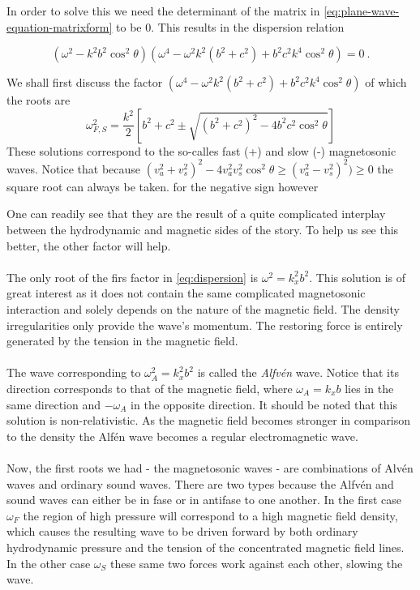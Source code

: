 In order to solve this we need the determinant of the matrix in \autoref{eq:plane-wave-equation-matrixform} to be $0$. This results in the dispersion relation

\begin{equation}
\label{eq:dispersion}
(\omega^2 - k^2 b^2\cos^2\theta)\left( \omega^4 - \omega^2k^2(b^2+c^2) + b^2 c^2k^4\cos^2\theta  \right) = 0 \ .
\end{equation}


We shall first discuss the factor $\left( \omega^4 - \omega^2k^2(b^2+c^2) + b^2 c^2k^4\cos^2\theta  \right)$
of which the roots are
\begin{equation}
	\omega_{F,S}^2 = \frac{k^2}{2} \left[ b^2+c^2 \pm \sqrt{(b^2+c^2)^2-4b^2c^2\cos^2\theta} \right] 	
	\label{eq:magnetosonic-phase-speed}
\end{equation}
These solutions correspond to the so-calles fast (+) and slow (-) magnetosonic waves. 
Notice that because $(v_a^2+v_s^2)^2-4v_a^2v_s^2\cos^2\theta \geq (v_a^2-v_s^2)^2) \geq 0$ the square root can always be taken.
for the negative sign however

One can readily see that they are the result of a quite complicated interplay between the hydrodynamic and magnetic sides of the story. 
To help us see this better, the other factor will help.\\
\\
The only root of the firs factor in \autoref{eq:dispersion} is $ \omega^2 = k_x^2 b^2 $. This solution is of great interest as it does not contain the same complicated magnetosonic interaction and solely depends on the nature of the magnetic field. The density irregularities only provide the wave's momentum. The restoring force is entirely generated by the tension in the magnetic field.\\
\\
The wave corresponding to $\omega_A^2 = k_x^2 b^2$ is called the \textit{Alfvén} wave. Notice that its direction corresponds to that of the magnetic field, where $\omega_A = k_x b$ lies in the same direction and $-\omega_A$ in the opposite direction. It should be noted that this solution is non-relativistic. As the magnetic field becomes stronger in comparison to the density the Alfén wave becomes a regular electromagnetic wave.\\
\\
Now, the first roots we had - the magnetosonic waves - are combinations of Alvén waves and ordinary sound waves. There are two types because the Alfvén and sound waves can either be in fase or in antifase to one another. In the first case $\omega_F$ the region of high pressure will correspond to a high magnetic field density, which causes the resulting wave to be driven forward by both ordinary hydrodynamic pressure and the tension of the concentrated magnetic field lines. In the other case $\omega_S$ these same two forces work against each other, slowing the wave.



